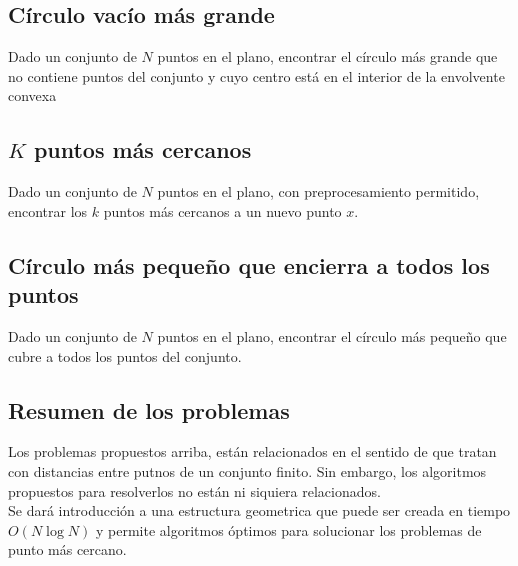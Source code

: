 \subsection{Círculo vacío más grande}
Dado un conjunto de $N$ puntos en el plano, encontrar el círculo más grande que no contiene puntos del conjunto y cuyo centro está en el interior de la envolvente convexa

\subsection{$K$ puntos más cercanos}
Dado un conjunto de $N$ puntos en el plano, con preprocesamiento permitido, encontrar los $k$ puntos más cercanos a un nuevo punto $x$.

\subsection{Círculo más pequeño que encierra a todos los puntos}
Dado un conjunto de $N$ puntos en el plano, encontrar el círculo más pequeño que cubre a todos los puntos del conjunto.

\subsection{Resumen de los problemas}
Los problemas propuestos arriba, están relacionados en el sentido de que tratan con distancias entre putnos de un conjunto finito. Sin embargo, los algoritmos propuestos para resolverlos no están ni siquiera relacionados. \\
Se dará introducción a una estructura geometrica que puede ser creada en tiempo $O(N \log N)$ y permite algoritmos óptimos para solucionar los problemas de punto más cercano.

























